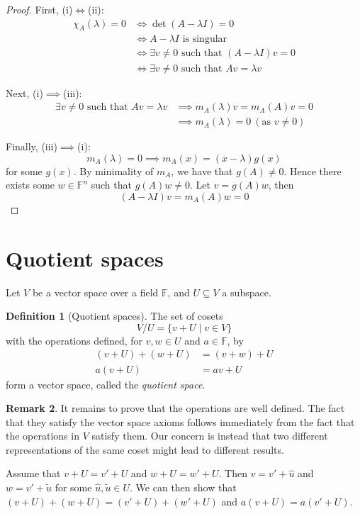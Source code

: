 \documentclass[10pt,fleqn]{article}
\newcommand{\field}{\mathbb{F}}
\theoremstyle{definition} \newtheorem{defn}{Definition}[section]
\theoremstyle{plain}      \newtheorem{thm}[defn]{Theorem}
\theoremstyle{plain}      \newtheorem{prop}[defn]{Proposition}
\theoremstyle{plain}      \newtheorem{lem}[defn]{Lemma}
\theoremstyle{plain}      \newtheorem{cor}[defn]{Corollary}
\theoremstyle{plain}      \newtheorem{ad}[defn]{Addendum}
\theoremstyle{definition} \newtheorem{ex}[defn]{Example}
\theoremstyle{definition} \newtheorem{rem}[defn]{Remark}
\numberwithin{equation}{subsection}
\begin{document}
\begin{proof}
    First, (i)$\iff$(ii):
    \begin{align*}
        \chi_A(\lambda)=0
        &\iff
        \det(A-\lambda I)=0\\
        &\iff
        A-\lambda I\text{ is singular}\\
        &\iff
        \exists v\neq0\text{ such that }(A-\lambda I)v=0\\
        &\iff
        \exists v\neq0\text{ such that }Av=\lambda v
    \end{align*}

    Next, (i)$\implies$(iii):
    \begin{align*}
        \exists v\neq0\text{ such that }Av=\lambda v
        &\implies
        m_A(\lambda)v=m_A(A)v=0\\
        &\implies
        m_A(\lambda)=0~(\text{as }v\neq0)
    \end{align*}

    Finally, (iii)$\implies$(i):
    \[
        m_A(\lambda)=0\implies
        m_A(x)=(x-\lambda)g(x)
    \]
    for some $g(x)$.
    By minimality of $m_A$, we have that $g(A)\neq0$.
    Hence there exists some $w\in\field^n$ such that $g(A)w\neq0$.
    Let $v=g(A)w$, then
    \[
        (A-\lambda I)v=
        m_A(A)w=
        0
    \]
\end{proof}


\section{Quotient spaces}

Let $V$ be a vector space over a field $\field$, and $U\subseteq V$ a subspace.

\begin{defn}[Quotient spaces]
    The set of cosets
    \[
        V/U=
        \{v+U\mid v\in V\}
    \]
    with the operations defined, for $v,w\in U$ and $a\in\field$, by
    \begin{align*}
        (v+U)+(w+U)
        &=
        (v+w)+U\\
        a(v+U)
        &=
        av+U
    \end{align*}
    form a vector space, called the \emph{quotient space}.
\end{defn}

\begin{rem}
    It remains to prove that the operations are well defined.
    The fact that they satisfy the vector space axioms follows immediately from the fact that the operations in $V$ satisfy them.
    Our concern is instead that two different representations of the same coset might lead to different results.

    Assume that $v+U=v'+U$ and $w+U=w'+U$.
    Then $v=v'+\hat{u}$ and $w=v'+\tilde{u}$ for some $\hat{u},\tilde{u}\in U$.
    We can then show that $(v+U)+(w+U)=(v'+U)+(w'+U)$ and $a(v+U)=a(v'+U)$.
\end{rem}
\end{document}
